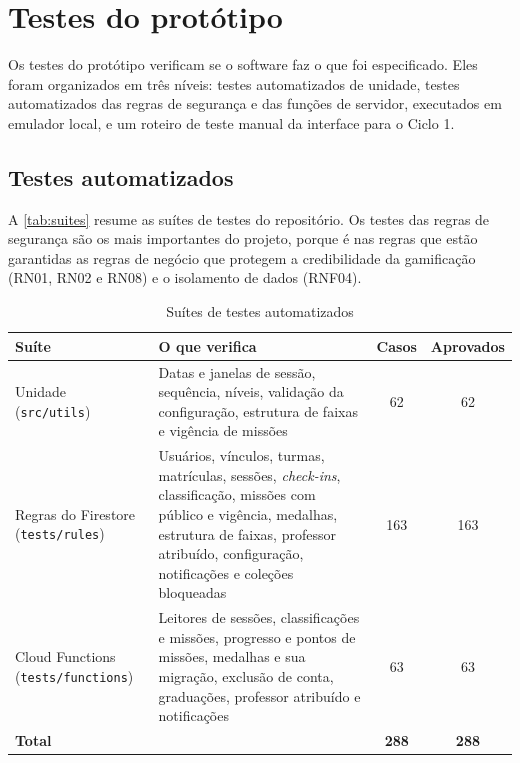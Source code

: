 \section{Testes do protótipo}
\label{sec:testes-prototipo}

Os testes do protótipo verificam se o software faz o que foi
especificado. Eles foram organizados em três níveis: testes automatizados
de unidade, testes automatizados das regras de segurança e das funções
de servidor, executados em emulador local, e um roteiro de teste manual
da interface para o Ciclo 1.

\subsection{Testes automatizados}

A \autoref{tab:suites} resume as suítes de testes do repositório. Os
testes das regras de segurança são os mais importantes do projeto,
porque é nas regras que estão garantidas as regras de negócio que
protegem a credibilidade da gamificação (RN01, RN02 e RN08) e o
isolamento de dados (RNF04).

\begin{table}[H]
  \centering
  \caption{Suítes de testes automatizados}
  \label{tab:suites}
  \footnotesize
  \begin{tabular}{p{3.6cm}p{6.6cm}cc}
    \toprule
    \textbf{Suíte} & \textbf{O que verifica} & \textbf{Casos} & \textbf{Aprovados} \\
    \midrule
    Unidade (\texttt{src/utils}) & Datas e janelas de sessão, sequência, níveis, validação da configuração, estrutura de faixas e vigência de missões & 62 & 62 \\
    Regras do Firestore (\texttt{tests/rules}) & Usuários, vínculos, turmas, matrículas, sessões, \textit{check-ins}, classificação, missões com público e vigência, medalhas, estrutura de faixas, professor atribuído, configuração, notificações e coleções bloqueadas & 163 & 163 \\
    Cloud Functions (\texttt{tests/functions}) & Leitores de sessões, classificações e missões, progresso e pontos de missões, medalhas e sua migração, exclusão de conta, graduações, professor atribuído e notificações & 63 & 63 \\
    \midrule
    \textbf{Total} & & \textbf{288} & \textbf{288} \\
    \bottomrule
  \end{tabular}
\end{table}

